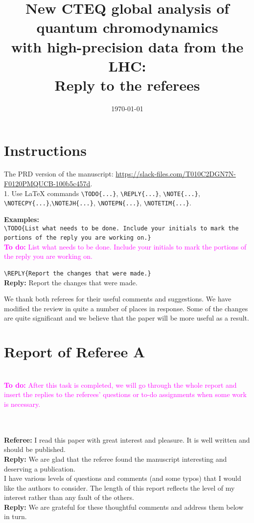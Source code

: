 \documentclass[aps,prd,amsmath,nofootinbib,floatfix,fleqn]{revtex4}
\newcommand{\TODO}[1]{\textcolor{magenta}{
\quad\vspace{3pt} \\ {\bf To do:} #1 \\
}}
\newcommand{\REPLY}[1]{\textcolor{redish}{\quad \\
{\bf Reply:} #1 \\
}}
\begin{document}
\date{\today}
\title{New CTEQ global analysis of quantum chromodynamics\\ with high-precision data
from the LHC:\\ Reply to the referees} 
\maketitle

\section*{Instructions}

The PRD version of the manuscript: \url{https://slack-files.com/T010C2DGN7N-F0120PMQUCB-100b5c457d}.\\

1. Use LaTeX commands {\tt \textbackslash TODO\{...\}}, {\tt \textbackslash REPLY\{...\}}, {\tt \textbackslash NOTE\{...\}}, {\tt \textbackslash NOTECPY\{...\}},{\tt \textbackslash NOTEJH\{...\}},
{\tt \textbackslash NOTEPN\{...\}}, {\tt \textbackslash NOTETIM\{...\}}.

\vspace{6pt}
{\bf Examples:}\\

{\tt \textbackslash TODO\{List what needs to be done. Include your initials to mark the portions of the reply you are working on.\}}
\TODO{List what needs to be done. Include your initials to mark the portions of the reply you are working on.}

{\tt \textbackslash REPLY\{Report the changes that were made.\}}
\REPLY{Report the changes that were made.}


\textcolor{redish}{We thank both referees for their useful comments and suggestions. We have modified the review in quite a number of places in response. Some of the changes are quite significant and we believe that the paper will be more useful as a result.}

\section{Report of Referee A}

\TODO{After this task is completed, we will go through the whole report and insert the replies to the referees' questions or to-do assignments when some work is necessary.\\\\}

{\bf Referee:} I read this paper with great interest and pleasure. It is well written and should be published. 
\REPLY{We are glad that the referee found the manuscript interesting and deserving a publication.} 
I have various levels of questions and comments (and some typos) that I would like the authors to consider. The length of this report reflects the level of my interest rather than any fault of the others.
\REPLY{We are grateful for these thoughtful comments and address them below in turn.}
\end{document}
